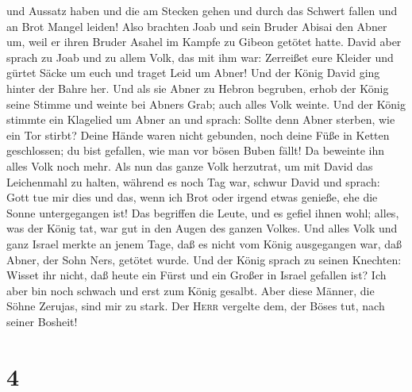 und Aussatz haben und die am Stecken gehen und durch das Schwert fallen
und an Brot Mangel leiden!  Also brachten Joab und sein
Bruder Abisai den Abner um, weil er ihren Bruder Asahel im Kampfe zu
Gibeon getötet hatte.  David aber sprach zu Joab und zu
allem Volk, das mit ihm war: Zerreißet eure Kleider und gürtet Säcke um
euch und traget Leid um Abner! Und der König David ging hinter der Bahre
her.  Und als sie Abner zu Hebron begruben, erhob der
König seine Stimme und weinte bei Abners Grab; auch alles Volk weinte.
 Und der König stimmte ein Klagelied um Abner an und
sprach: Sollte denn Abner sterben, wie ein Tor stirbt? 
Deine Hände waren nicht gebunden, noch deine Füße in Ketten geschlossen;
du bist gefallen, wie man vor bösen Buben fällt! Da beweinte ihn alles
Volk noch mehr.  Als nun das ganze Volk herzutrat, um mit
David das Leichenmahl zu halten, während es noch Tag war, schwur David
und sprach: Gott tue mir dies und das, wenn ich Brot oder irgend etwas
genieße, ehe die Sonne untergegangen ist!  Das begriffen
die Leute, und es gefiel ihnen wohl; alles, was der König tat, war gut
in den Augen des ganzen Volkes.  Und alles Volk und ganz
Israel merkte an jenem Tage, daß es nicht vom König ausgegangen war, daß
Abner, der Sohn Ners, getötet wurde.  Und der König
sprach zu seinen Knechten: Wisset ihr nicht, daß heute ein Fürst und ein
Großer in Israel gefallen ist?  Ich aber bin noch schwach
und erst zum König gesalbt. Aber diese Männer, die Söhne Zerujas, sind
mir zu stark. Der \textsc{Herr} vergelte dem, der Böses tut, nach seiner
Bosheit!

\hypertarget{section-3}{%
\section{4}\label{section-3}}

